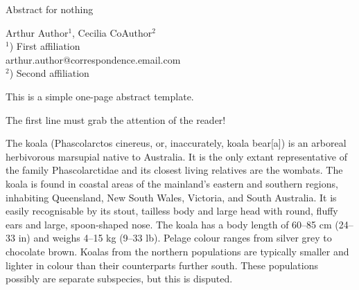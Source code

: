 \documentclass[a4paper]{article}
\begin{document}
\Large
 \begin{center}
Abstract for nothing\\ 

\hspace{10pt}

\large
Arthur Author$^1$, Cecilia CoAuthor$^2$ \\
\hspace{10pt}
\small  
$^1$) First affiliation\\
arthur.author@correspondence.email.com\\
$^2$) Second affiliation
\end{center} %

\hspace{10pt}
\normalsize
This is a simple one-page abstract template.

The first line must grab the attention of the reader!

The koala (Phascolarctos cinereus, or, inaccurately, koala bear[a]) is an arboreal herbivorous marsupial native to Australia. It is the only extant representative of the family Phascolarctidae and its closest living relatives are the wombats. The koala is found in coastal areas of the mainland's eastern and southern regions, inhabiting Queensland, New South Wales, Victoria, and South Australia. It is easily recognisable by its stout, tailless body and large head with round, fluffy ears and large, spoon-shaped nose. The koala has a body length of 60–85 cm (24–33 in) and weighs 4–15 kg (9–33 lb). Pelage colour ranges from silver grey to chocolate brown. Koalas from the northern populations are typically smaller and lighter in colour than their counterparts further south. These populations possibly are separate subspecies, but this is disputed.
\end{document}
